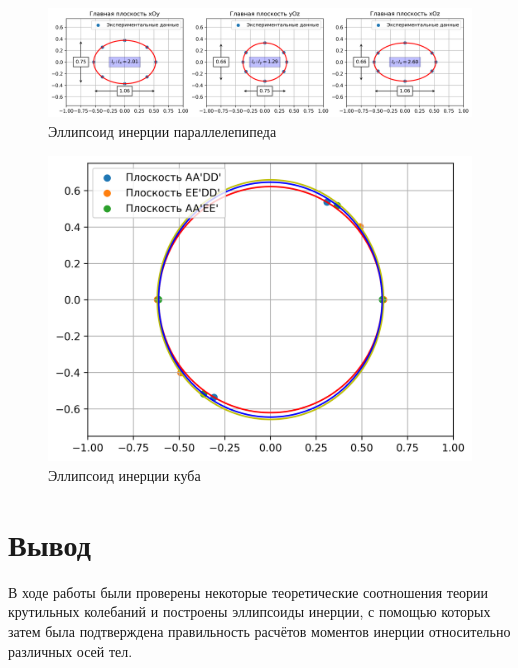 			\begin{figure}[h]
				\centering
				\includegraphics[width=\linewidth]{parped.png}
				\caption{Эллипсоид инерции параллелепипеда}
				\label{fig:parped}
			\end{figure}
			\begin{figure}[h]
				\centering
				\includegraphics[width=0.8\linewidth]{cube.png}
				\caption{Эллипсоид инерции куба}
				\label{fig:cube_el}
			\end{figure}
	\section{Вывод}
		В ходе работы были проверены некоторые теоретические соотношения теории крутильных колебаний и построены эллипсоиды инерции, с помощью которых затем была подтверждена правильность расчётов моментов инерции относительно различных осей тел. 
